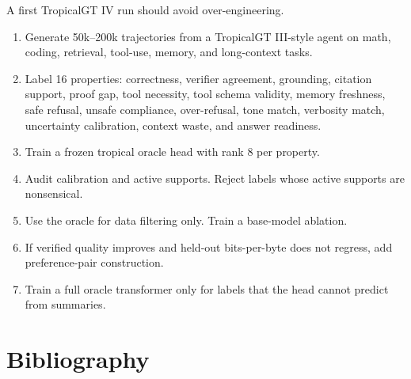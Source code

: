 \documentclass[11pt]{article}
\theoremstyle{definition}
\theoremstyle{remark}
\numberwithin{equation}{section}
\begin{document}
A first TropicalGT IV run should avoid over-engineering.
\begin{enumerate}
    \item Generate 50k--200k trajectories from a TropicalGT III-style agent on math, coding, retrieval, tool-use, memory, and long-context tasks.
    \item Label 16 properties: correctness, verifier agreement, grounding, citation support, proof gap, tool necessity, tool schema validity, memory freshness, safe refusal, unsafe compliance, over-refusal, tone match, verbosity match, uncertainty calibration, context waste, and answer readiness.
    \item Train a frozen tropical oracle head with rank 8 per property.
    \item Audit calibration and active supports.  Reject labels whose active supports are nonsensical.
    \item Use the oracle for data filtering only.  Train a base-model ablation.
    \item If verified quality improves and held-out bits-per-byte does not regress, add preference-pair construction.
    \item Train a full oracle transformer only for labels that the head cannot predict from summaries.
\end{enumerate}

\section{Bibliography}
\end{document}
